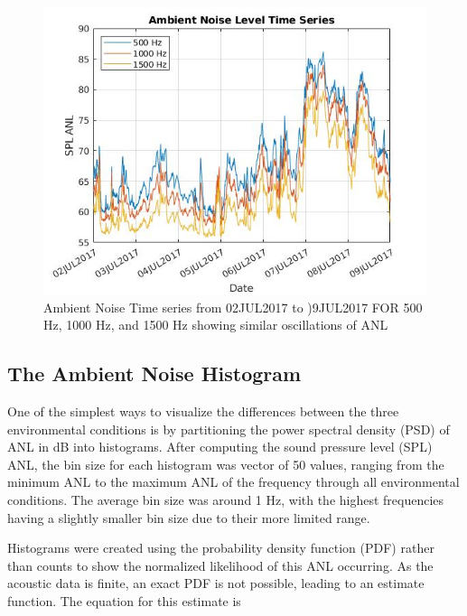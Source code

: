 \begin{figure}[ht]
\centering
\includegraphics[scale=0.6]{Figures/timeseries_500_1500_july_overlay.jpg}
\caption{Ambient Noise Time series from 02JUL2017 to )9JUL2017 FOR 500 Hz, 1000 Hz, and 1500 Hz showing similar oscillations of ANL}
\label{fig_timeseries}
\end{figure}





\subsection{The Ambient Noise Histogram} \label{sec_hist}
One of the simplest ways to visualize the differences between the three environmental conditions is by partitioning the power spectral density (PSD) of ANL in dB into histograms. After computing the sound pressure level (SPL) ANL, the bin size for each histogram was vector of 50 values, ranging from the minimum ANL to the maximum ANL of the frequency through all environmental conditions. The average bin size was around 1 Hz, with the highest frequencies having a slightly smaller bin size due to their more limited range. %

Histograms were created using the probability density function (PDF) rather than counts to show the normalized likelihood of this ANL occurring. As the acoustic data is finite, an exact PDF is not possible, leading to an estimate function. The equation for this estimate is

